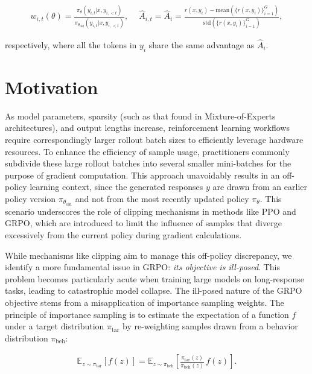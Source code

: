 \begin{align}
    w_{i,t}(\theta)=\frac{ \pi_{\theta} (y_{i,t} | x, y_{i,<t}) }{ \pi_{\theta_\text{old}} (y_{i,t} | x,y_{i,<t})},\quad\ 
    \widehat{A}_{i,t} = \widehat{A}_{i} = \frac{r(x, y_i) - \mathrm{mean} \left( \{ r(x, y_i) \}_{i=1}^G \right) }{ \mathrm{std} \left( \{ r(x, y_i) \}_{i=1}^G \right) },
\end{align}

respectively, where all the tokens in $y_i$ share the same advantage as $\widehat{A}_{i}$.

\section{Motivation}
\label{sec:motivation}

As model parameters, sparsity (such as that found in Mixture-of-Experts architectures), and output lengths increase, reinforcement learning workflows require correspondingly larger rollout batch sizes to efficiently leverage hardware resources. To enhance the efficiency of sample usage, practitioners commonly subdivide these large rollout batches into several smaller mini-batches for the purpose of gradient computation. This approach unavoidably results in an off-policy learning context, since the generated responses $y$ are drawn from an earlier policy version $\pi_{\theta_\text{old}}$ and not from the most recently updated policy $\pi_\theta$. This scenario underscores the role of clipping mechanisms in methods like PPO and GRPO, which are introduced to limit the influence of samples that diverge excessively from the current policy during gradient calculations.

While mechanisms like clipping aim to manage this off-policy discrepancy, we identify a more fundamental issue in GRPO: \textit{its objective is ill-posed}. This problem becomes particularly acute when training large models on long-response tasks, leading to catastrophic model collapse. The ill-posed nature of the GRPO objective stems from a misapplication of importance sampling weights. The principle of importance sampling is to estimate the expectation of a function $f$ under a target distribution $\pi_\text{tar}$ by re-weighting samples drawn from a behavior distribution $\pi_\text{beh}$:

\begin{align}
\mathbb{E}_{z \sim \pi_\text{tar}} \left[ f(z) \right] = \mathbb{E}_{z \sim \pi_\text{beh}} \left[ \frac{ \pi_\text{tar} (z) }{ \pi_\text{beh} (z)} \, f(z) \right].
\end{align}

